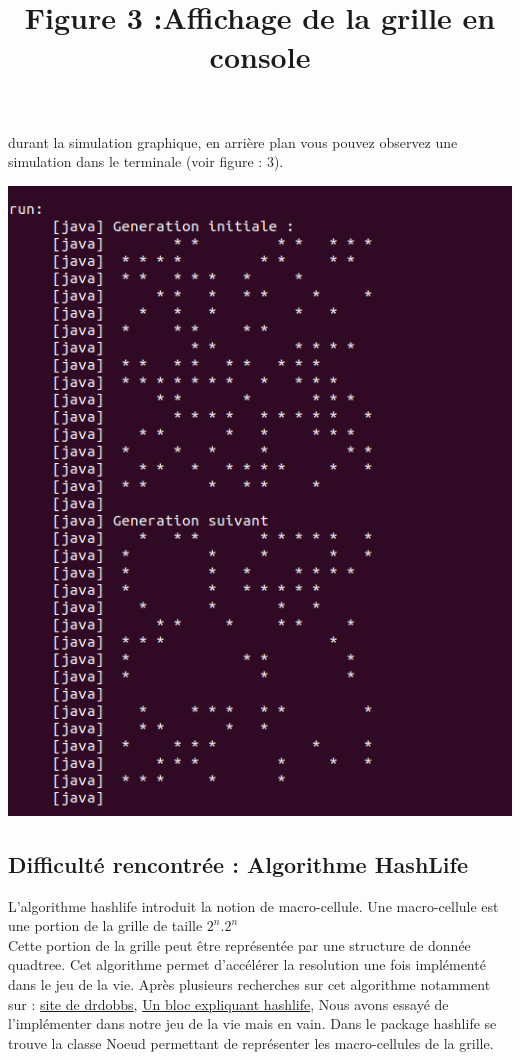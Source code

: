 \documentclass[a4paper,12pt]{article} %
\begin{document}
durant la simulation graphique, en arrière plan vous pouvez observez une simulation dans le terminale (voir figure : 3).
			
\begin{center}
\includegraphics[scale=0.5]{./images/AffichageConsole.png}\\
\title{Figure 3 :Affichage de la grille en console}
\end{center}


			
     

			
\subsection{Difficulté rencontrée : Algorithme HashLife}
            L'algorithme hashlife introduit la notion de macro-cellule. Une macro-cellule est une portion
        de la grille de taille $2^n.2^n$
        \\Cette portion de la grille peut être représentée par une structure de donnée quadtree. Cet algorithme permet d'accélérer la resolution une fois implémenté dans le jeu de la vie. Après plusieurs recherches sur cet algorithme notamment sur :
        \href{https://www.drdobbs.com/jvm/an-algorithm-for-compressing-space-and-t/184406478}{site de drdobbs},
        \href{https://www.dev-mind.blog/hashlife/}{Un bloc expliquant hashlife},
        Nous avons essayé de l'implémenter dans notre jeu de la vie  mais en vain.
        Dans le package hashlife se trouve la classe Noeud permettant de représenter les macro-cellules de la grille.
        
\end{document}
